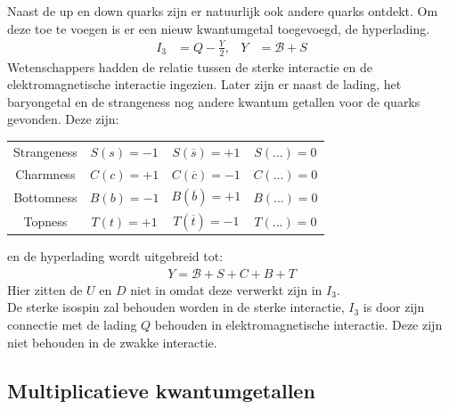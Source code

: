 \documentclass[../main.tex]{subfiles}
\begin{document}
Naast de up en down quarks zijn er natuurlijk ook andere quarks ontdekt. Om deze toe te voegen is er een nieuw kwantumgetal toegevoegd, de hyperlading.
\begin{equation}
    \begin{aligned}
        \label{eq:hyperlading}
        I_3&=Q-\frac{Y}{2},& Y&=\mathcal{B}+S
    \end{aligned}
\end{equation}
Wetenschappers hadden de relatie tussen de sterke interactie en de elektromagnetische interactie ingezien. Later zijn er naast de lading, het baryongetal en de strangeness nog andere kwantum getallen voor de quarks gevonden. Deze zijn:

\begin{table}[h]
    \centering
    \label{tab:kwantum_getallen}
    \begin{tabular}{cccc}
        Strangeness & $S(s)=-1$ & $S(\overline s)=+1$   & $S(...)=0$    \\
        Charmness       & $C(c)=+1$ & $C(\overline c)=-1$   & $C(...)=0$    \\
        Bottomness  & $B(b)=-1$ & $B(\overline b)=+1$   & $B(...)=0$    \\
        Topness     & $T(t)=+1$ & $T(\overline t)=-1$   & $T(...)=0$
    \end{tabular}
\end{table}

en de hyperlading wordt uitgebreid tot:
\begin{equation}
    \begin{aligned}
        \label{eq:hyperlading_total}
        Y=\mathcal{B}+S+C+B+T
    \end{aligned}
\end{equation}
Hier zitten de $U$ en $D$ niet in omdat deze verwerkt zijn in $I_3$.\\
De sterke isospin zal behouden worden in de sterke interactie, $I_3$ is door zijn connectie met de lading $Q$ behouden in elektromagnetische interactie. Deze zijn niet behouden in de zwakke interactie.

\subsection{Multiplicatieve kwantumgetallen}%
\label{sub:multiplicatieve_kwantum_getallen}
\end{document}
